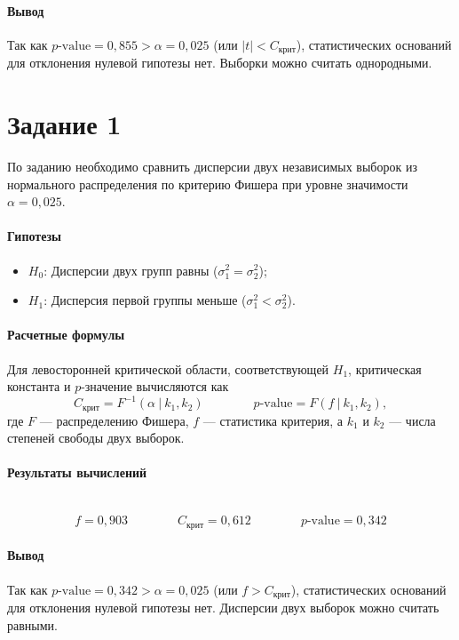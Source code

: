 \documentclass{article}
\begin{document}
\paragraph{Вывод} Так как $p\text{-value} = 0,855 > \alpha = 0,025$ (или $|t| < C_{\text{крит}}$), статистических оснований для отклонения нулевой гипотезы нет. Выборки можно считать однородными.


\section*{Задание 1}
По заданию необходимо сравнить дисперсии двух независимых выборок из нормального распределения по критерию Фишера при уровне значимости $\alpha = 0,025$.

\paragraph{Гипотезы}
\begin{itemize}[nosep]
    \item $H_0$: Дисперсии двух групп равны ($\sigma_1^2 = \sigma_2^2$);
    \item $H_1$: Дисперсия первой группы меньше ($\sigma_1^2 < \sigma_2^2$).
\end{itemize}

\paragraph{Расчетные формулы} Для левосторонней критической области, соответствующей $H_1$, критическая константа и $p$-значение вычисляются как
\[ C_{\text{крит}} = F^{-1}(\alpha ~|~ k_1, k_2) \qquad\qquad p\text{-value} = F(f ~|~ k_1, k_2), \]
где $F$ --- распределению Фишера, $f$ --- статистика критерия, а $k_1$ и $k_2$ --- числа степеней свободы двух выборок.

\paragraph{Результаты вычислений} ~\vspace{-0.5\baselineskip}
\[ f = 0,903 \qquad\qquad C_{\text{крит}} = 0,612 \qquad\qquad p\text{-value} = 0,342 \]

\paragraph{Вывод} Так как $p\text{-value} = 0,342 > \alpha = 0,025$ (или $f > C_{\text{крит}}$), статистических оснований для отклонения нулевой гипотезы нет. Дисперсии двух выборок можно считать равными.
\end{document}

